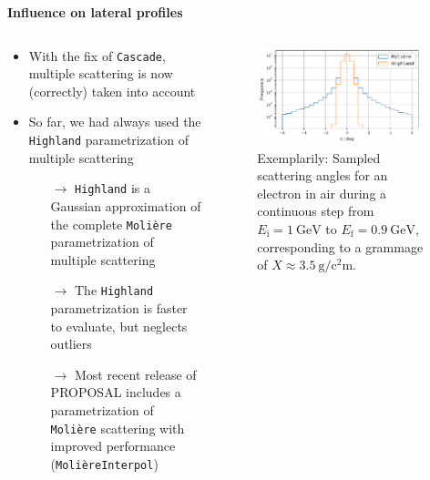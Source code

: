 \documentclass[aspectratio=1610, 9pt]{beamer}
\begin{document}
\begin{frame}
  \textbf{Influence on lateral profiles}
  \vspace{5mm}

      \begin{columns}[onlytextwidth]
        \begin{column}{0.45\textwidth}
            \begin{itemize}
              \item With the fix of \texttt{Cascade}, multiple scattering is now (correctly) taken into account
              \item So far, we had always used the \texttt{Highland} parametrization of multiple scattering
              \begin{itemize}
                \item[$\rightarrow$] \texttt{Highland} is a Gaussian approximation of the complete \texttt{Molière} parametrization of multiple scattering
                \item[$\rightarrow$] The \texttt{Highland} parametrization is faster to evaluate, but neglects outliers
                \item[$\rightarrow$] Most recent release of PROPOSAL includes a parametrization of \texttt{Molière} scattering with improved performance (\texttt{MolièreInterpol})
              \end{itemize}
            \end{itemize}
        \end{column}
        \begin{column}{0.55\textwidth}
            \begin{figure}
                \centering
                \includegraphics[width=0.95\textwidth]{plots/scattering_comparison.pdf}
                \caption{Exemplarily: Sampled scattering angles for an electron in air during a continuous step from $E_\text{i} = \SI{1}{\giga\electronvolt}$ to $E_\text{f} = \SI{0.9}{\giga\electronvolt}$, corresponding to a grammage of $X \approx \SI{3.5}{\gram\per\square\centi\meter}$.}
            \end{figure}
        \end{column}
    \end{columns}

\end{frame}
\end{document}

